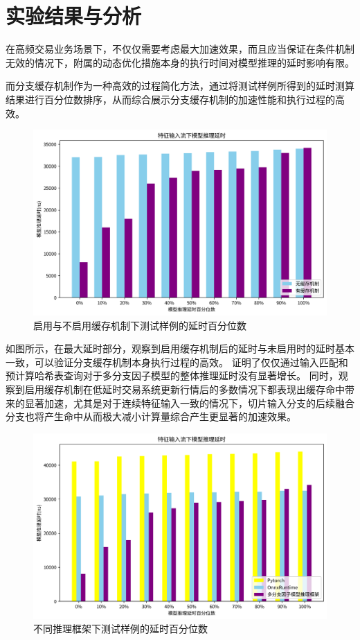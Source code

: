 \section{实验结果与分析}
在高频交易业务场景下，不仅仅需要考虑最大加速效果，而且应当保证在条件机制无效的情况下，附属的动态优化措施本身的执行时间对模型推理的延时影响有限。

而分支缓存机制作为一种高效的过程简化方法，通过将测试样例所得到的延时测算结果进行百分位数排序，从而综合展示分支缓存机制的加速性能和执行过程的高效。

\begin{figure}[h]
    \centering
    \includegraphics[width=1\textwidth]{image/chap04/outstime.png}
    \caption{启用与不启用缓存机制下测试样例的延时百分位数}
    \label{fig:hole}
\end{figure}

如图所示，在最大延时部分，观察到启用缓存机制后的延时与未启用时的延时基本一致，可以验证分支缓存机制本身执行过程的高效。
证明了仅仅通过输入匹配和预计算哈希表查询对于多分支因子模型的整体推理延时没有显著增长。
同时，观察到启用缓存机制在低延时交易系统更新行情后的多数情况下都表现出缓存命中带来的显著加速，尤其是对于连续特征输入一致的情况下，切片输入分支的后续融合分支也将产生命中从而极大减小计算量综合产生更显著的加速效果。

\begin{figure}[h]
    \centering
    \includegraphics[width=1\textwidth]{image/chap04/outsframe.png}
    \caption{不同推理框架下测试样例的延时百分位数}
    \label{fig:hole}
\end{figure}

